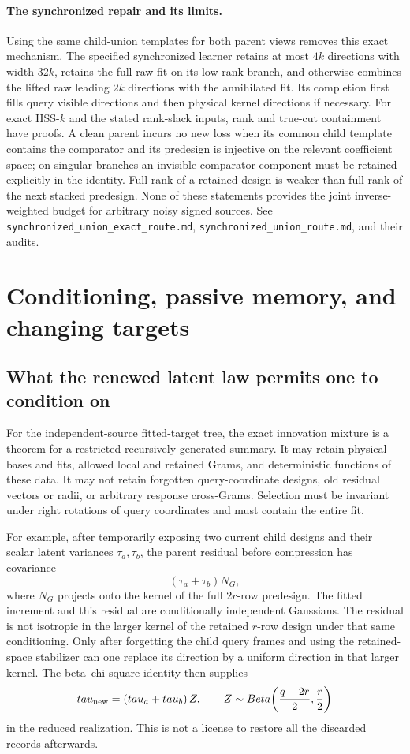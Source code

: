 \documentclass[11pt,oneside,openany,a4paper]{report}
\numberwithin{equation}{chapter}
\theoremstyle{definition}
\theoremstyle{remark}
\newcommand{\sourcefile}[1]{{\small\nolinkurl{#1}}}
\begin{document}
\paragraph{The synchronized repair and its limits.}
Using the same child-union templates for both parent views removes
this exact mechanism.  The specified synchronized learner retains at
most $4k$ directions with width $32k$, retains the full raw fit on its
low-rank branch, and otherwise combines the lifted raw leading $2k$
directions with the annihilated fit.  Its completion first fills query
visible directions and then physical kernel directions if necessary.
For exact HSS-$k$ and the stated rank-slack inputs, rank and true-cut
containment have proofs.  A clean parent incurs no new loss when its
common child template contains the comparator and its predesign is
injective on the relevant coefficient space; on singular branches an
invisible comparator component must be retained explicitly in the
identity.  Full rank of a retained design is weaker than full rank of
the next stacked predesign.  None of these statements provides the
joint inverse-weighted budget for arbitrary noisy signed sources.
See \sourcefile{synchronized_union_exact_route.md},
\sourcefile{synchronized_union_route.md}, and their audits.

\section{Conditioning, passive memory, and changing targets}
\label{sec:later-conditioning}

\subsection{What the renewed latent law permits one to condition on}

For the independent-source fitted-target tree, the exact innovation
mixture is a theorem for a restricted recursively generated summary.
It may retain physical bases and fits, allowed local and retained
Grams, and deterministic functions of these data.  It may not retain
forgotten query-coordinate designs, old residual vectors or radii, or
arbitrary response cross-Grams.  Selection must be invariant under
right rotations of query coordinates and must contain the entire fit.

For example, after temporarily exposing two current child designs and
their scalar latent variances $\tau_a,\tau_b$, the parent residual
before compression has covariance
\[
 (\tau_a+\tau_b)N_G,
\]
where $N_G$ projects onto the kernel of the full $2r$-row predesign.
The fitted increment and this residual are conditionally independent
Gaussians.  The residual is not isotropic in the larger kernel of the
retained $r$-row design under that same conditioning.  Only after
forgetting the child query frames and using the retained-space
stabilizer can one replace its direction by a uniform direction in
that larger kernel.  The beta--chi-square identity then supplies
\[
 \tau_{\rm new}=(\tau_a+\tau_b)\,Z,\qquad
 Z\sim\operatorname{Beta}\!\left(\frac{q-2r}{2},\frac r2\right)
\]
in the reduced realization.  This is not a license to restore all the
discarded records afterwards.
\end{document}
